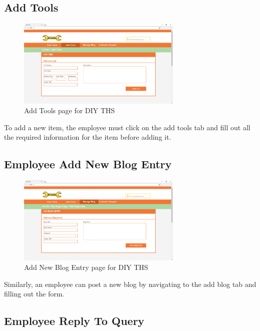 \hypertarget{add-tools}{%
\subsection{Add Tools}\label{add-tools}}

\begin{figure}[H]
      \centering
      \includegraphics[trim = 0 0 0 0, clip, width=0.7\textwidth]{TempImg/addtool.png}
      \caption{Add Tools page for DIY THS}
 \end{figure}

To add a new item, the employee must click on the add tools tab and fill
out all the required information for the item before adding it.

\hypertarget{employee-add-new-blog-entry}{%
\subsection{Employee Add New Blog
Entry}\label{employee-add-new-blog-entry}}

\begin{figure}[H]
      \centering
      \includegraphics[trim = 0 0 0 0, clip, width=0.7\textwidth]{TempImg/addblog.png}
      \caption{Add New Blog Entry page for DIY THS}
 \end{figure}

Similarly, an employee can post a new blog by navigating to the add blog
tab and filling out the form.

\hypertarget{employee-reply-to-query}{%
\subsection{Employee Reply To Query}\label{employee-reply-to-query}}

